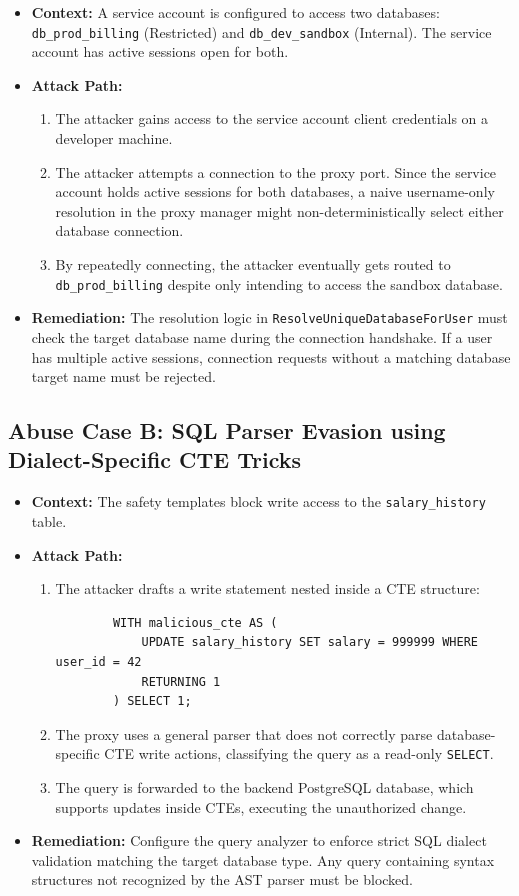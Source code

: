 \begin{itemize}[leftmargin=*]
    \item \textbf{Context:} A service account is configured to access two databases: \texttt{db\_prod\_billing} (Restricted) and \texttt{db\_dev\_sandbox} (Internal). The service account has active sessions open for both.
    \item \textbf{Attack Path:}
    \begin{enumerate}
        \item The attacker gains access to the service account client credentials on a developer machine.
        \item The attacker attempts a connection to the proxy port. Since the service account holds active sessions for both databases, a naive username-only resolution in the proxy manager might non-deterministically select either database connection.
        \item By repeatedly connecting, the attacker eventually gets routed to \texttt{db\_prod\_billing} despite only intending to access the sandbox database.
    \end{enumerate}
    \item \textbf{Remediation:} The resolution logic in \texttt{ResolveUniqueDatabaseForUser} must check the target database name during the connection handshake. If a user has multiple active sessions, connection requests without a matching database target name must be rejected.
\end{itemize}

\subsection{Abuse Case B: SQL Parser Evasion using Dialect-Specific CTE Tricks}
\begin{itemize}[leftmargin=*]
    \item \textbf{Context:} The safety templates block write access to the \texttt{salary\_history} table.
    \item \textbf{Attack Path:}
    \begin{enumerate}
        \item The attacker drafts a write statement nested inside a CTE structure:
        \begin{verbatim}
        WITH malicious_cte AS (
            UPDATE salary_history SET salary = 999999 WHERE user_id = 42
            RETURNING 1
        ) SELECT 1;
        \end{verbatim}
        \item The proxy uses a general parser that does not correctly parse database-specific CTE write actions, classifying the query as a read-only \texttt{SELECT}.
        \item The query is forwarded to the backend PostgreSQL database, which supports updates inside CTEs, executing the unauthorized change.
    \end{enumerate}
    \item \textbf{Remediation:} Configure the query analyzer to enforce strict SQL dialect validation matching the target database type. Any query containing syntax structures not recognized by the AST parser must be blocked.
\end{itemize}

